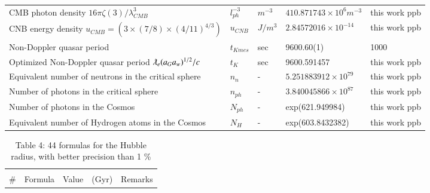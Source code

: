 \documentclass[a4paper,9pt]{article}
\begin{document}
\begin{appendix}
\begin{table}
\begin{tabular}{lllll}
 CMB photon density $16 \pi \zeta (3)/\lambda_{CMB}^3$  & $l_{ph}^{-3}$  & $m^{-3}$   & $410.871743 \times 10^6 m^{-3}$ & this work ppb\\
 
  CNB energy density $u_{CMB} = (3\times (7/8) \times (4/11)^{4/3})$ & $u_{CNB}$ & $J/m^3$ & $2.84572016\times 10^{-14}$ & this work ppb\\
  
  Non-Doppler quasar period & $t_{Kmes}$ & sec & 9600.60(1) & 1000 \\
  
 Optimized Non-Doppler quasar period $\lambdabar_e (a_Ga_w)^{1/2}/c$ & $t_{K}$ & sec & 9600.591457 & this work ppb \\
 
 Equivalent number of neutrons in the critical sphere & $n_n$ & - & $5.251883912 \times 10^{79}$ & this work ppb \\
 
 Number of photons in the critical sphere  & $n_{ph}$ & - & $3.840045866 \times 10^{87}$ & this work ppb \\
 
 Number of photons in the Cosmos  & $N_{ph}$ & - & exp(621.949984) & this work ppb \\
 
 Equivalent number of Hydrogen atoms in the Cosmos  & $N_H$ & - & exp(603.8432382) & this work ppb \\
 \bottomrule
  \end{tabular}
\end{table}
 

\begin{table}
\caption{Table 4: 44 formulas for the Hubble radius, with better precision than 1 \%}
\label{tab:4:table4}
  \hskip-2.0cm\begin{tabular}{llll}
    \toprule
    \multicolumn{4}{c}{}                   \\
    \cmidrule(r){1-4}
   \#     & Formula     & Value~~(Gyr) & Remarks \\
    \midrule
    

\end{tabular}
\end{table}
\end{appendix}
\end{document}
